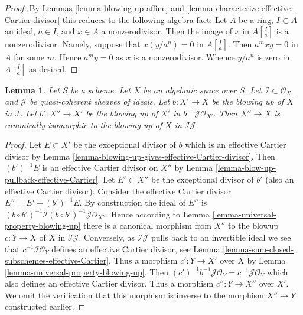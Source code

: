 \documentclass{stacks-project}
\theoremstyle{plain}
\newtheorem{lemma}[subsection]{Lemma}
\theoremstyle{definition}
\theoremstyle{remark}
\numberwithin{equation}{subsection}
\begin{document}
\begin{proof}
By Lemmas \ref{lemma-blowing-up-affine} and
\ref{lemma-characterize-effective-Cartier-divisor}
this reduces to the following algebra fact:
Let $A$ be a ring, $I \subset A$ an ideal, $a \in I$, and $x \in A$
a nonzerodivisor. Then the image of $x$ in $A[\frac{I}{a}]$ is a
nonzerodivisor. Namely, suppose that $x (y/a^n) = 0$ in $A[\frac{I}{a}]$.
Then $a^mxy = 0$ in $A$ for some $m$. Hence $a^my = 0$ as $x$ is a
nonzerodivisor. Whence $y/a^n$ is zero in $A[\frac{I}{a}]$ as desired.
\end{proof}

\begin{lemma}
\label{lemma-blowing-up-two-ideals}
Let $S$ be a scheme. Let $X$ be an algebraic space over $S$.
Let $\mathcal{I} \subset \mathcal{O}_X$ and $\mathcal{J}$ be
quasi-coherent sheaves of ideals. Let $b : X' \to X$ be the blowing up
of $X$ in $\mathcal{I}$. Let $b' : X'' \to X'$ be the blowing up of
$X'$ in $b^{-1}\mathcal{J} \mathcal{O}_{X'}$. Then $X'' \to X$
is canonically isomorphic to the blowing up of $X$ in $\mathcal{I}\mathcal{J}$.
\end{lemma}

\begin{proof}
Let $E \subset X'$ be the exceptional divisor of $b$ which is an effective
Cartier divisor by
Lemma \ref{lemma-blowing-up-gives-effective-Cartier-divisor}.
Then $(b')^{-1}E$ is an effective Cartier divisor on $X''$ by
Lemma \ref{lemma-blow-up-pullback-effective-Cartier}.
Let $E' \subset X''$ be the exceptional divisor of $b'$ (also an effective
Cartier divisor). Consider the effective Cartier divisor
$E'' = E' + (b')^{-1}E$. By construction the ideal of $E''$ is
$(b \circ b')^{-1}\mathcal{I} (b \circ b')^{-1}\mathcal{J} \mathcal{O}_{X''}$.
Hence according to Lemma \ref{lemma-universal-property-blowing-up}
there is a canonical morphism from $X''$ to the blowup $c : Y \to X$
of $X$ in $\mathcal{I}\mathcal{J}$. Conversely, as $\mathcal{I}\mathcal{J}$
pulls back to an invertible ideal we see that
$c^{-1}\mathcal{I}\mathcal{O}_Y$ defines
an effective Cartier divisor, see
Lemma \ref{lemma-sum-closed-subschemes-effective-Cartier}.
Thus a morphism $c' : Y \to X'$ over $X$ by
Lemma \ref{lemma-universal-property-blowing-up}.
Then $(c')^{-1}b^{-1}\mathcal{J}\mathcal{O}_Y = c^{-1}\mathcal{J}\mathcal{O}_Y$
which also defines an effective Cartier divisor. Thus a morphism
$c'' : Y \to X''$ over $X'$. We omit the verification that this
morphism is inverse to the morphism $X'' \to Y$ constructed earlier.
\end{proof}
\end{document}
